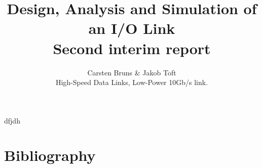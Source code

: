 \documentclass[12pt,journal,compsoc,onecolumn]{IEEEtran}
\begin{document}
%
\title{Design, Analysis and Simulation of an I/O Link\\Second interim report}

\author{Carsten Bruns
        \& Jakob Toft%



\begin{IEEEkeywords}
High-Speed Data Links, Low-Power 10Gb/s link.
\end{IEEEkeywords}}


\maketitle

\IEEEdisplaynotcompsoctitleabstractindextext
\IEEEpeerreviewmaketitle

dfjdh\cite{rajesh2011a} %







%
%
%
%
%
%
%




\ifCLASSOPTIONcaptionsoff
  \newpage
\fi

\newpage
\section{Bibliography}
{}

\end{document}
